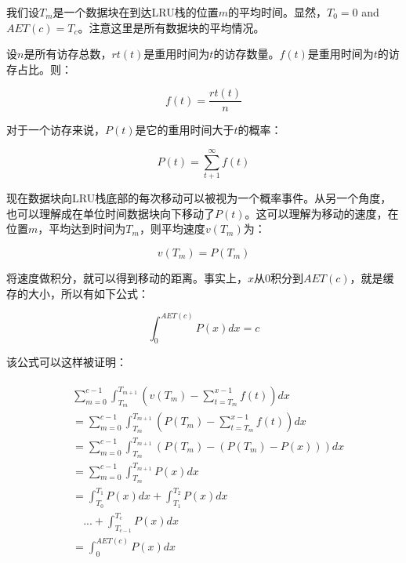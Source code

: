 我们设$T_m$是一个数据块在到达LRU栈的位置$m$的平均时间。显然，$T_0=0$ and $\textit{AET}(c) = T_{c}$。注意这里是所有数据块的平均情况。

设$n$是所有访存总数，$rt(t)$是重用时间为$t$的访存数量。$f(t)$是重用时间为$t$的访存占比。则：

\begin{equation}
f(t) = \frac{rt(t)}{n}
\label{eq:aet_f}
\end{equation}

对于一个访存来说，$P(t)$是它的重用时间大于$t$的概率：

\begin{equation}
P(t) = \sum_{t+1}^{\infty}f(t)
\label{eq:aet_rt}
\end{equation}

现在数据块向LRU栈底部的每次移动可以被视为一个概率事件。从另一个角度，也可以理解成在单位时间数据块向下移动了$P(t)$。这可以理解为移动的速度，在位置$m$，平均达到时间为$T_m$，则平均速度$v(T_m)$为：

\begin{equation}
v(T_m) = P(T_m) 
\label{eq:aet_vm}
\end{equation}

将速度做积分，就可以得到移动的距离。事实上，$x$从0积分到$\textit{AET}(c)$，就是缓存的大小，所以有如下公式：

\begin{equation}
\int_0^{AET(c)} P(x) dx = c
\label{eq:aet_aet}
\end{equation}

该公式可以这样被证明：

\begin{align}
\begin{split}
 & \sum_{m=0}^{c-1} {\int_{T_m}^{T_{m+1}} (v(T_m) - \sum_{t=T_m}^{x-1}f(t))} dx \nonumber\\
 &= \sum_{m=0}^{c-1} {\int_{T_m}^{T_{m+1}} (P(T_m) - \sum_{t=T_m}^{x-1}f(t))} dx \nonumber\\
&= \sum_{m=0}^{c-1} {\int_{T_m}^{T_{m+1}} (P(T_m) - (P(T_m) - P(x)))} dx  \nonumber\\
&= \sum_{m=0}^{c-1} {\int_{T_m}^{T_{m+1}} P(x)} dx  \nonumber\\
&= \int_{T_0}^{T_1} P(x) dx + \int_{T_1}^{T_2} P(x) dx\nonumber\\
&\quad ...  + \int_{T_{c-1}}^{T_c} P(x) dx \nonumber\\
&= \int_0^{AET(c)} P(x) dx \nonumber
\end{split}
\end{align}

